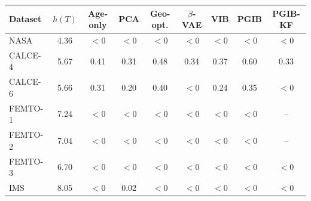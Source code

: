 \begin{tabular}{l c c c c c c c c}
\hline
Dataset & $h(T)$ & Age-only & PCA & Geo-opt. & $\beta$-VAE & VIB & PGIB & PGIB-KF \\
\hline
NASA & 4.36 & $<0$ & $<0$ & $<0$ & $<0$ & $<0$ & $<0$ & $<0$ \\
CALCE-4 & 5.67 & 0.41 & 0.31 & 0.48 & 0.34 & 0.37 & 0.60 & 0.33 \\
CALCE-6 & 5.66 & 0.31 & 0.20 & 0.40 & $<0$ & 0.24 & 0.35 & $<0$ \\
FEMTO-1 & 7.24 & $<0$ & $<0$ & $<0$ & $<0$ & $<0$ & $<0$ & -- \\
FEMTO-2 & 7.04 & $<0$ & $<0$ & $<0$ & $<0$ & $<0$ & $<0$ & -- \\
FEMTO-3 & 6.70 & $<0$ & $<0$ & $<0$ & $<0$ & $<0$ & $<0$ & $<0$ \\
IMS & 8.05 & $<0$ & 0.02 & $<0$ & $<0$ & $<0$ & $<0$ & $<0$ \\
\hline
\end{tabular}
